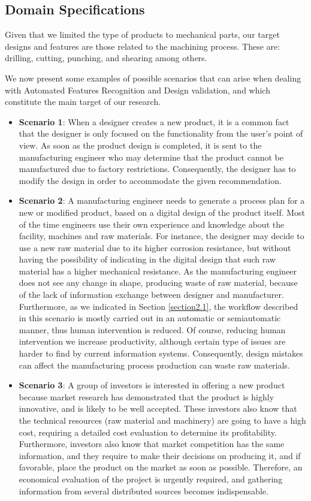 \subsection{Domain Specifications }\label{4.1.1}

Given that we limited the type of products to mechanical parts, our target designs and features are those related to the machining process. These are: drilling, cutting, punching, and shearing among others. 

We now present some examples of possible scenarios that can arise when dealing with Automated Features Recognition and Design validation, and which constitute the main target of our research.

\begin{itemize}
	
	\item \textbf{Scenario 1}: When a designer creates a new product, it is a common fact that the designer is only focused on the functionality from the user’s point of view. As soon as the product design  is completed, it is sent to the manufacturing engineer who may determine that the product cannot be manufactured due to factory restrictions. Consequently, the designer has to modify the design in order to accommodate the given recommendation. 
	\item \textbf{Scenario 2}: A manufacturing engineer needs to generate a process plan for a new or modified product, based on a digital design of the product itself. Most of the time  engineers use   their own experience and knowledge about the facility, machines and raw materials. For instance, the designer may decide to use a new raw material due to its higher corrosion resistance, but without having the possibility of indicating in the digital design that such raw material has a higher mechanical   resistance. As the manufacturing engineer does not see any change in shape, producing   waste of raw material, because of the lack of information exchange between designer and manufacturer. Furthermore, as we indicated in Section \ref{section2.1}, the workflow described in this scenario is mostly carried out in an automatic or semiautomatic manner, thus human intervention is reduced. Of course, reducing human intervention we increase productivity, although certain type of issues are harder to find by current information systems. Consequently, design mistakes can affect the manufacturing process production can waste raw materials. 
	
	\item \textbf{Scenario 3}: A group of investors is interested in offering a new product because market research has demonstrated that the product is highly innovative, and is likely to be well accepted. These investors also know that the technical resources (raw material and machinery) are going to have a high cost, requiring a detailed cost evaluation to determine its profitability. Furthermore, investors also know that market competition has the same information, and they require to make their decisions on producing it, and if favorable, place the product on the market as soon as possible. Therefore, an economical evaluation of the project is urgently required, and gathering information from several distributed sources becomes indispensable. 
	

\end{itemize}
